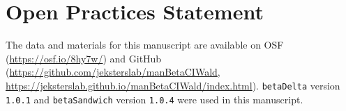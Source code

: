 \documentclass[man]{apa7}\usepackage[]{graphicx}\usepackage[]{xcolor}
\begin{document}
\section{Open Practices Statement}

The data and materials for this manuscript are available on
OSF
(\url{https://osf.io/8hy7w/})
and
GitHub
(\url{https://github.com/jeksterslab/manBetaCIWald},
\url{https://jeksterslab.github.io/manBetaCIWald/index.html}).
\texttt{betaDelta} version \texttt{1.0.1}
and
\texttt{betaSandwich} version \texttt{1.0.4}
were used in this manuscript.

\printbibliography
\end{document}
